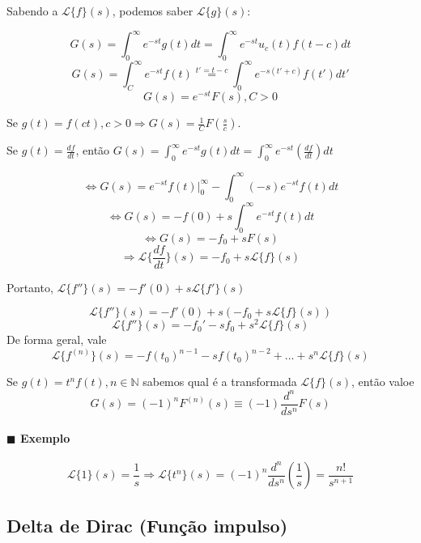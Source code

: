 Sabendo a $\mathcal{L}\{f\} (s)$, podemos saber $\mathcal{L} \{g\}(s)$:

$$ G(s) = \int_{0}^{\infty} e^{-st} g(t) dt = \int_{0}^{\infty} e^{-st} u_c(t) f(t -c) dt $$
$$ G(s) = \int_{C}^{\infty} e^{-st} f(t) \overset{t' = t-c}{=} \int_{0}^{\infty} e^{-s(t'+c)} f(t') dt' $$
$$ G(s) = e^{-st} F(s) , C > 0 $$

\item[$\blacksquare$] Se $g(t) = f(ct), c > 0 \Rightarrow G(s) = \frac{1}{C} F(\frac{s}{c})$.
\item[$\blacksquare$] Se $g(t) = \frac{df}{dt}$, então $G(s) = \int_{0}^{\infty} e^{-st} g(t) dt = \int_{0}^{\infty} e^{-st}
  \left( \frac{df}{dt} \right) dt $

  $$ \Leftrightarrow G(s) = e^{-st} f(t) \bigg|_{0}^{\infty} - \int_{0}^{\infty} (-s)e^{-st} f(t) dt  $$
  $$ \Leftrightarrow G(s) = -f(0) + s \int_{0}^{\infty} e^{-st} f(t) dt   $$
  $$ \Leftrightarrow G(s) = -f_0 + s F(s)  $$
  $$ \Longrightarrow \mathcal{L} \bigg\{ \frac{df}{dt} \bigg\} (s) = -f_0 + s \mathcal{L} \{f\} (s)  $$

  Portanto, $\mathcal{L}\{f''\} (s) = -f'(0) + s \mathcal{L}\{f'\} (s)$

  $$ \mathcal{L}\{f''\} (s) = -f'(0) + s \left(-f_0 + s \mathcal{L}\{f\} (s) \right) $$
  $$ \mathcal{L} \{f''\} (s) = -f_0' - sf_0 + s^2 \mathcal{L} \{f\} (s) $$
  De forma geral, vale
  \begin{equation}
    \mathcal{L} \{ f^{(n)} \} (s) = -f(t_0)^{n-1} - s f(t_0)^{n-2} + \dots + s^{n} \mathcal{L} \{ f\} (s)
    \label{eq:transformada_derivada}
  \end{equation}

  Se $g(t) = t^n f(t), n \in \mathbb{N}$ sabemos qual é a transformada $\mathcal{L} \{f\} (s)$, então valoe
  $$ G(s) = (-1)^{n} F^{(n)} (s) \equiv (-1) \frac{d^{n}}{ds^{n}} F(s)  $$

  \paragraph{$\blacksquare$ Exemplo}

  $$ \mathcal{L} \{ 1 \} (s) = \frac{1}{s} \Rightarrow \mathcal{L} \{ t^n \} (s) = (-1)^{n} \frac{d^n}{ds^n} \left( \frac{1}{s}
  \right) = \frac{n!}{s^{n+1}}$$



  

\subsection{Delta de Dirac (Função impulso)}


